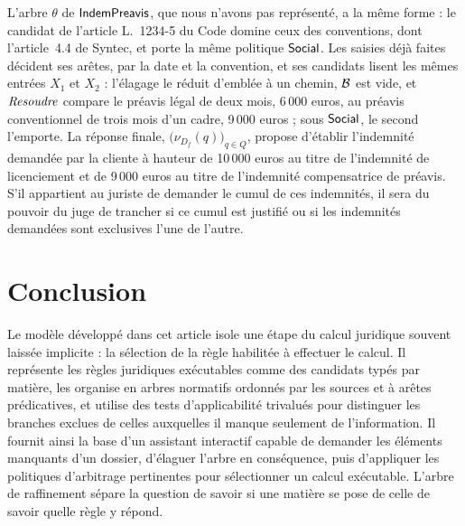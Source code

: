 \documentclass[review]{jflart}
\begin{document}
L'arbre \(\theta\) de \(\mathsf{IndemPreavis}\), que nous n'avons pas représenté, a la même
forme : le candidat de l'article L.~1234-5 du Code domine ceux des
conventions, dont l'article~4.4 de Syntec, et porte la même politique
\(\mathsf{Social}\). Les saisies déjà faites décident ses arêtes, par la date et la
convention, et ses candidats lisent les mêmes entrées \(X_1\) et \(X_2\) :
l'élagage le réduit d'emblée à un chemin, \(\mathcal{B}\) est vide, et
\(\mathit{Resoudre}\) compare le préavis légal de deux mois, 6\,000 euros, au
préavis conventionnel de trois mois d'un cadre, 9\,000 euros ; sous
\(\mathsf{Social}\), le second l'emporte. La réponse finale,
\(\bigl(\nu_{D_f}(q)\bigr)_{q\in Q}\), propose d'établir l'indemnité
demandée par la cliente à hauteur de 10\,000 euros au titre de l'indemnité
de licenciement et de 9\,000 euros au titre de l'indemnité compensatrice de
préavis. S'il appartient au juriste de demander le cumul de ces indemnités,
il sera du pouvoir du juge de trancher si ce cumul est justifié ou si les
indemnités demandées sont exclusives l'une de l'autre.

\section{Conclusion}\label{sec:conclusion}

Le modèle développé dans cet article isole une étape du calcul juridique
souvent laissée implicite : la sélection de la règle habilitée à effectuer le
calcul. Il représente les règles juridiques exécutables comme des candidats
typés par matière, les organise en arbres normatifs ordonnés par les sources et
à arêtes prédicatives, et utilise des tests d'applicabilité trivalués pour
distinguer les branches exclues de celles auxquelles il manque seulement de
l'information. Il fournit ainsi la base d'un assistant interactif capable de
demander les éléments manquants d'un dossier, d'élaguer l'arbre en
conséquence, puis d'appliquer les politiques d'arbitrage pertinentes pour
sélectionner un calcul exécutable. L'arbre de raffinement sépare la
question de savoir si une matière se pose de celle de savoir quelle règle y
répond. 
\end{document}
